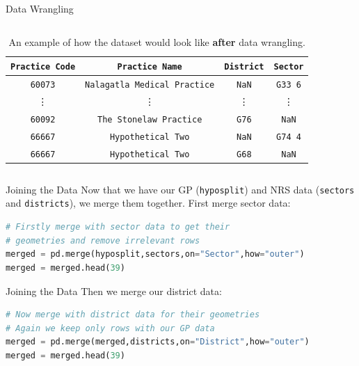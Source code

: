 \documentclass[hyperref={breaklinks,colorlinks,
   urlcolor=blue,citecolor=blue,linkcolor=red}]{beamer}
\begin{document}
\begin{frame}{Data Wrangling}
\begin{columns}
\begin{column}{\dimexpr\paperwidth-10pt}
\begin{table}
\begin{center}
\begin{tabular}{c | c | c |c}
\toprule
\texttt{Practice Code} & \texttt{Practice Name} & \texttt{District} & \texttt{Sector} \\
\midrule
\midrule
\texttt{60073} & \texttt{Nalagatla Medical Practice} & \texttt{NaN} & \texttt{G33 6}\\
\vdots & \vdots & \vdots & \vdots\\
\texttt{60092} & \texttt{The Stonelaw Practice} & \texttt{G76} & \texttt{NaN}\\
\texttt{66667} & \texttt{Hypothetical Two} & \texttt{NaN} & \texttt{G74 4}\\
\texttt{66667} & \texttt{Hypothetical Two} & \texttt{G68} & \texttt{NaN}\\ 
\bottomrule
\end{tabular}
\caption{An example of how the dataset would look like \textbf{after} data wrangling.}
\end{center}
\end{table}
\end{column}
\end{columns}
\end{frame}

\begin{frame}[fragile]{Joining the Data}
Now that we have our GP (\texttt{hyposplit}) and NRS data (\texttt{sectors} and \texttt{districts}), we merge them together.
First merge sector data:
\begin{lstlisting}[language=Python,frame=single]
# Firstly merge with sector data to get their
# geometries and remove irrelevant rows
merged = pd.merge(hyposplit,sectors,on="Sector",how="outer")   
merged = merged.head(39)                                      
\end{lstlisting}
\end{frame}

\begin{frame}[fragile]{Joining the Data}
Then we merge our district data:
\begin{lstlisting}[language=Python,frame=single]
# Now merge with district data for their geometries 
# Again we keep only rows with our GP data
merged = pd.merge(merged,districts,on="District",how="outer")  
merged = merged.head(39)                                       
\end{lstlisting}
\end{frame}
\end{document}
